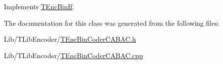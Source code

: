 Implements \hyperlink{class_t_enc_bin_if}{T\+Enc\+Bin\+If}.



The documentation for this class was generated from the following files\+:\begin{DoxyCompactItemize}
\item 
Lib/\+T\+Lib\+Encoder/\hyperlink{_t_enc_bin_coder_c_a_b_a_c_8h}{T\+Enc\+Bin\+Coder\+C\+A\+B\+A\+C.\+h}\item 
Lib/\+T\+Lib\+Encoder/\hyperlink{_t_enc_bin_coder_c_a_b_a_c_8cpp}{T\+Enc\+Bin\+Coder\+C\+A\+B\+A\+C.\+cpp}\end{DoxyCompactItemize}
